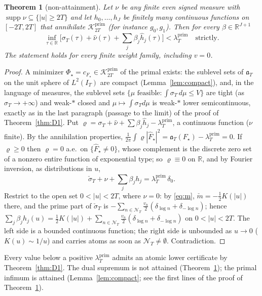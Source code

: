 \documentclass[10pt]{amsart}
\newtheorem{theorem}{Theorem}[section]
\theoremstyle{definition}
\theoremstyle{remark}
\newcommand{\R}{\mathbb R}
\newcommand{\supp}{\operatorname{supp}}
\newcommand{\Kp}{\mathcal K^{\mathrm{prim}}_{2T}}
\newcommand{\IT}{I_T}
\newcommand{\lamP}{\lambda^{\mathrm{prim}}_T}
\newcommand{\sT}{\sigma_T}
\newcommand{\nuh}{\widehat\nu}
\newcommand{\Fh}{\widehat F}
\newcommand{\NT}{\mathcal N_T}
\begin{document}
\begin{theorem}[non-attainment]\label{thm:O}
Let $\nu$ be any finite even signed measure with $\supp\nu\subseteq\{|u|\ge2T\}$ and let
$h_0,\dots,h_J$ be finitely many continuous functions on $[-2T,2T]$ that annihilate $\Kp$
(for instance $g_0,g_1$). Then for every $\beta\in\R^{J+1}$
\[
\inf_{\tau\in\R}\Big[\sT(\tau)+\nuh(\tau)+\sum_j\beta_j\widehat h_j(\tau)\Big]<\lamP\quad\text{strictly.}
\]
The statement holds for every finite weight family, including $v=0$.
\end{theorem}
\begin{proof}
A minimizer $\Phi_\star=c_{F_\star}\in\Kp$ of the primal exists: the sublevel sets of
$\mathfrak a_T$ on the unit sphere of $L^2(\IT)$ are compact (Lemma~\ref{lem:compact}),
and, in the language of measures, the sublevel sets $\{\mu\text{ feasible}:\int\sT\,d\mu\le V\}$ are tight (as
$\sT\to+\infty$) and weak-$*$ closed and $\mu\mapsto\int\sT d\mu$ is
weak-$*$ lower semicontinuous, exactly as in the last paragraph (passage to the limit) of the proof of Theorem~\ref{thm:D1}. Put $\varrho=\sT+\nuh+\sum\beta_j\widehat h_j-\lamP$, a
continuous function ($\nu$ finite). By the annihilation properties,
$\frac1{2\pi}\int\varrho|\Fh_\star|^2=\mathfrak a_T(F_\star)-\lamP=0$. If $\varrho\ge0$ then $\varrho=0$ a.e.\ on
$\{\Fh_\star\ne0\}$, whose complement is the discrete zero set of a nonzero entire function of
exponential type; so $\varrho\equiv0$ on $\R$, and by Fourier inversion, as distributions in $u$,
\[
\check\sT+\nu+\sum_j\beta_jh_j=\lamP\,\delta_0 .
\]
Restrict to the open set $0<|u|<2T$, where $\nu=0$: by \eqref{eq:m}, $\check m=-\frac12K(|u|)$
there, and the prime part of $\check\sT$ is $-\sum_{n\in\NT}\frac{v_n}2(\delta_{\log n}+\delta_{-\log n})$;
hence $\sum_j\beta_jh_j(u)=\frac12K(|u|)+\sum_{n\in\NT}\frac{v_n}2(\delta_{\log n}+\delta_{-\log n})$
on $0<|u|<2T$. The left side is a bounded continuous function; the right side is unbounded as
$u\to0$ ($K(u)\sim1/u$) and carries atoms as soon as $\NT\neq\emptyset$. Contradiction.
\end{proof}

Every value below a positive $\lamP$ admits an atomic lower
certificate by Theorem~\ref{thm:D1}. The dual supremum is not
attained (Theorem~\ref{thm:O}); the primal infimum is attained
(Lemma~\ref{lem:compact}; see the first lines of the proof of Theorem~\ref{thm:O}).
\end{document}
